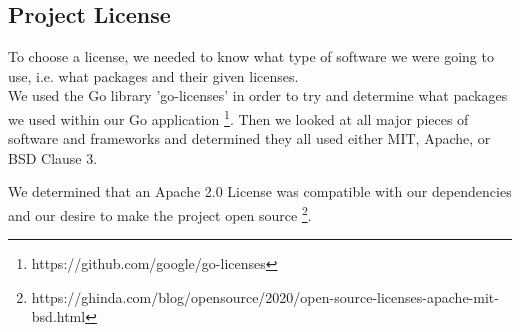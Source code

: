 \subsection{Project License}
To choose a license, we needed to know what type of software we were going to use, i.e. what packages and their given licenses. \\

We used the Go library 'go-licenses' in order to try and determine what packages we used within our Go application \footnote{https://github.com/google/go-licenses}. 
Then we looked at all major pieces of software and frameworks and determined they all used either MIT, Apache, or BSD Clause 3.

We determined that an Apache 2.0 License was compatible with our dependencies and our desire to make the project open source \footnote{https://ghinda.com/blog/opensource/2020/open-source-licenses-apache-mit-bsd.html}. 